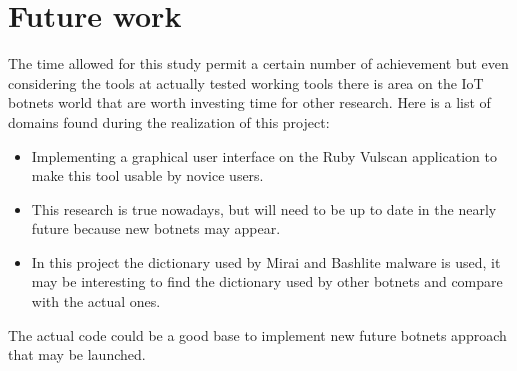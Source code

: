 \documentclass{report}
\begin{document}
\chapter{Future work}
The time allowed for this study permit a certain number of achievement but even considering the tools at actually tested working tools there is area on the IoT botnets world that are worth investing time for other research. Here is a list of domains found during the realization of this project:
\begin{itemize}
 \item Implementing a graphical user interface on the Ruby Vulscan application to make this tool usable by novice users.
 \item This research is true nowadays, but will need to be up to date in the nearly future because new botnets may appear.
 \item In this project the dictionary used by Mirai and Bashlite malware is used, it may be interesting to find the dictionary used by other botnets and compare with the actual ones.
\end{itemize}
The actual code could be a good base to implement new future botnets approach that may be launched.

\printbibliography

\listoffigures
{}
\end{document}
